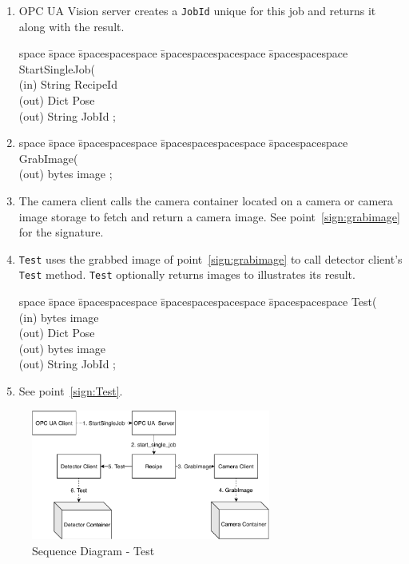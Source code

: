 \begin{enumerate}
    \item OPC UA Vision server creates a \texttt{JobId} unique for this job and returns it along with the result.
    \begin{tabbing}
    space \= space \= spacespacespace \= spacespacespacespace \= spacespacespace \kill
    \>  StartSingleJob(\\
    \>  \>  (in)	 \> 	String          \> RecipeId\\
    \>  \>  (out)	 \> 	Dict          \> Pose \\
    \>  \>  (out)	 \> 	String          \> JobId ; 
    \end{tabbing}
    \item 
    \begin{tabbing}
    space \= space \= spacespacespace \= spacespacespacespace \= spacespacespace \kill
    \>  GrabImage(\\
    \>  \>  (out)	 \> 	bytes          \> image ; 
    \end{tabbing} \label{sign:grabimage}
    \item The camera client calls the camera container located on a camera or camera image storage to fetch and return a camera image. See point~\ref{sign:grabimage} for the signature.
    \item \texttt{Test} uses the grabbed image of point~\ref{sign:grabimage} to call detector client's \texttt{Test} method. \texttt{Test} optionally returns images to illustrates its result. 
    \begin{tabbing}
    space \= space \= spacespacespace \= spacespacespacespace \= spacespacespace \kill
    \>  Test(\\
    \>  \>  (in)	 \> 	bytes          \> image\\
    \>  \>  (out)	 \> 	Dict          \> Pose \\
    \>  \>  (out)	 \> 	bytes          \> image \\
    \>  \>  (out)	 \> 	String          \> JobId ; 
    \end{tabbing}\label{sign:Test}
    \item See point~\ref{sign:Test}.
\end{enumerate}

\begin{figure}[ht]
	\centering
  \includegraphics[width=0.7\textwidth]{img/SequenceDiagram-Test.pdf}
	\caption{Sequence Diagram - Test}
	\label{fig:SequenceDiagram-Test}
\end{figure}


